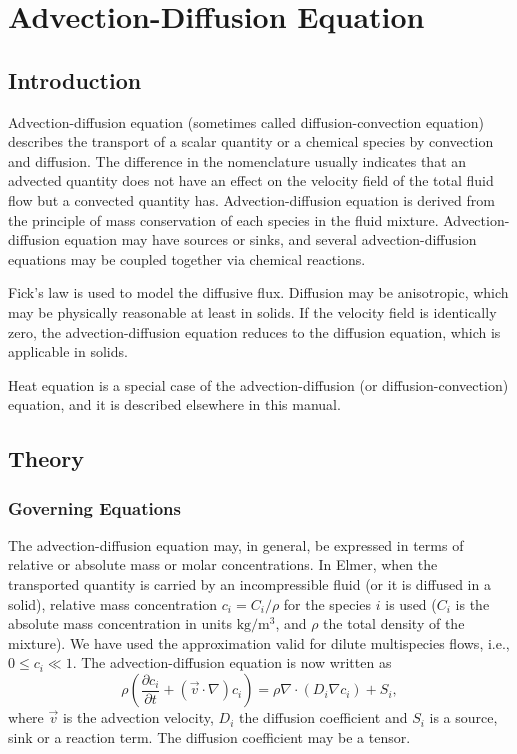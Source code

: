 \chapter{Advection-Diffusion Equation}
\noindent
{}

\section{Introduction}

Advection-diffusion equation (sometimes called diffusion-convection equation)
describes the transport of a scalar quantity or a chemical species by
convection and diffusion. The difference in the nomenclature usually indicates
that an advected quantity does not have an effect on the velocity field of
the total fluid flow but a convected quantity has. Advection-diffusion equation
is derived from the principle of mass conservation of each species in the fluid
mixture. Advection-diffusion equation may have sources or sinks, and several
advection-diffusion equations may be coupled together via chemical reactions.

Fick's law is used to model the diffusive flux. Diffusion may be anisotropic,
which may be physically reasonable at least in solids. If the velocity field
is identically zero, the advection-diffusion equation reduces to the diffusion
equation, which is applicable in solids.

Heat equation is a special case of the advection-diffusion
(or diffusion-convection) equation, and it is described elsewhere in this
manual.

\section{Theory}

\subsection{Governing Equations}

The advection-diffusion equation may, in general, be expressed in
terms of relative or absolute mass or molar concentrations. In Elmer,
when the transported quantity is carried by an incompressible fluid
(or it is diffused in a solid), relative mass concentration
$c_i=C_i/\rho$ for the species $i$ is used ($C_i$ is the absolute mass
concentration in units $\mathrm{kg}/\mathrm{m}^3$, and $\rho$ the
total density of the mixture). We have used the approximation valid
for dilute multispecies flows, i.e., $0\le c_i\ll 1$.  The
advection-diffusion equation is now written as
\begin{equation}
\rho  \left( \frac{\partial c_i}{\partial t}+(\vec v\cdot\nabla) c_i\right) = 
\rho\nabla\cdot(D_i\nabla c_i) + S_i,
\end{equation}
where $\vec v$ is the advection velocity, $D_i$ the diffusion coefficient
and $S_i$ is a source, sink or a reaction term. The diffusion coefficient may
be a tensor.

